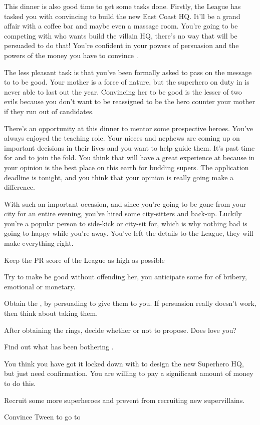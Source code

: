\documentclass[char]{LRSguildcamp1}
\begin{document}
This dinner is also good time to get some tasks done. Firstly, the League has tasked you with convincing \cArchitect{} to build the new East Coast HQ. It'll be a grand affair with a coffee bar and maybe even a massage room. You're going to be competing with \cOldest{} who wants \cArchitect{} build the villain HQ, there's no way that \cArchitect{} will be persuaded to do that! You're confident in your powers of persuasion and the powers of the money you have to convince \cArchitect{}. 

The less pleasant task is that you've been formally asked to pass on the message to \cGrandma{\parent} to be good. Your mother is a force of nature, but the superhero on duty in \pCityGrandma{} is never able to last out the year. Convincing her to be good is the lesser of two evils because you don't want to be reassigned to be the hero counter your mother if they run out of candidates. 

There's an opportunity at this dinner to mentor some prospective heroes. You've always enjoyed the teaching role. Your nieces and nephews are coming up on important decisions in their lives and you want to help guide them. It's past time for \cGrad{} and \cTeen{} to join the fold. You think that \cTween{} will have a great experience at \pSuperSchool{} because in your opinion \pSuperSchool{} is the best place on this earth for budding supers. The application deadline is tonight, and you think that your opinion is really going make a difference. 

With such an important occasion, and since you're going to be gone from your city for an entire evening, you've hired some city-sitters and back-up. Luckily you're a popular person to side-kick or city-sit for, which is why nothing bad is going to happy while you're away. You've left the details to the League, they will make everything right. 

\begin{itemz}[Goals]
	\item Keep the PR score of the League as high as possible
	\item Try to make \cGrandma{} be good without offending her, you anticipate some for of bribery, emotional or monetary. 
	\item Obtain the \iEngagementRings{}, by persuading \cGrandma{} to give them to you. If persuasion really doesn't work, then think about taking them. 
	\item After obtaining the rings, decide whether or not to propose. Does \cYS{} love you?  
	\item Find out what has been bothering \cYS{}. 
	\item You think you have got it locked down with \cArchitect{} to design the new Superhero HQ, but just need confirmation. You are willing to pay a significant amount of money to do this.  
	\item  Recruit some more superheroes and prevent \cOldest{} from recruiting new supervillains.
	\item Convince Tween to go to \pSuperSchool{} 
	
\end{itemz}
\end{document}
